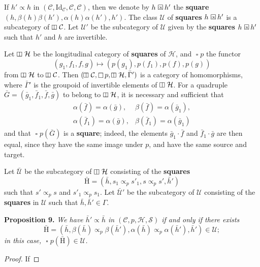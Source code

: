 \documentclass[fleqn]{article}
\newenvironment{itenv}[1]
  {\phantomsection\par\medskip\noindent\textbf{#1.}\itshape}
  {\par\medskip}
\newcommand{\oldpage}[1]{\marginpar{\footnotesize$\Big\vert$ \textit{p.~#1}}}
\newcommand{\unsure}[1]{{\color{purple}\textbf{#1}}}
\newcommand{\CC}{\mathcal{C}}
\newcommand{\HH}{\mathcal{H}}
\newcommand{\rHH}{\mathrm{H}}
\renewcommand{\SS}{\mathcal{S}}
\newcommand{\UU}{\mathcal{U}}
\newcommand{\subs}{\mathrel{\propto}}
\newcommand{\Id}{\mathrm{Id}}
\DeclareMathOperator{\sq}{\square}
\DeclareMathOperator{\vsq}{\raisebox{-.1em}{\rotatebox{90}{$\boxminus$}\,}}
\newcommand{\sqsubs}{\mathrel{\mathrlap{\square}\raisebox{.15em}{\scaleobj{0.7}{\,\propto}}}}
\begin{document}
If $h'\subs h$ in $(\CC,\Id_\CC,\CC,\CC)$, then we denote by $h\sqsubs h'$ the \unsure{square} $(h,\beta(h)\beta(h'),\alpha(h)\alpha(h'),h')$.
The class $\UU$ of \unsure{squares} $h\sqsubs h'$ is a subcategory of $\vsq\CC$.
Let $\UU'$ be the subcategory of $\UU$ given by the \unsure{squares} $h\sqsubs h'$ such that $h'$ and $h$ are invertible.

Let $\vsq\HH$ be the longitudinal category of \unsure{squares} of $\HH$, and $\sq p$ the functor
\[
  (g_1,f_1,f,g)
  \longmapsto (p(g_1),p(f_1),p(f),p(g))
\]
from $\vsq\HH$ to $\vsq\CC$.
Then $(\vsq\CC,\sq p,\vsq\HH,\bar{\Gamma}')$ is a category of homomorphisms, where $\bar{\Gamma}'$ is the groupoid of invertible elements of $\vsq\HH$.
For a quadruple $\bar{G}=(\bar{g}_1,\bar{f}_1,\bar{f},\bar{g})$ to belong to $\vsq\HH$, it is necessary and sufficient that
\[
  \begin{array}{ll}
    \alpha(\bar{f})=\alpha(\bar{g}),
    & \beta(\bar{f})=\alpha(\bar{g}_1),
  \\\alpha(\bar{f}_1)=\alpha(\bar{g}),
    & \beta(\bar{f}_1)=\alpha(\bar{g}_1)
  \end{array}
\]
and that $\sq p(\bar{G})$ is a \unsure{square};
indeed, the elements $\bar{g}_1\cdot\bar{f}$ and $\bar{f}_1\cdot\bar{g}$ are then equal, since they have the same image under $p$, and have the same source and target.

\oldpage{366}
Let $\bar{\UU}$ be the subcategory of $\vsq\HH$ consisting of the \unsure{squares}
\[
  \bar{\rHH}
  = (\bar{h}, s_1\subs_p s'_1, s\subs_p s', \bar{h}')
\]
such that $s'\subs_p s$ and $s'_1\subs_p s_1$.
Let $\bar{\UU}'$ be the subcategory of $\UU$ consisting of the \unsure{squares} in $\UU$ such that $\bar{h},\bar{h}'\in\Gamma$.

\begin{itenv}{Proposition 9}
  We have $\bar{h}'\subs\bar{h}$ in $(\CC,p,\HH,\SS)$ if and only if there exists
  \[
    \bar{\rHH}
    = \left(
      \bar{h},
      \beta(\bar{h})\subs_p\beta(\bar{h}'),
      \alpha(\bar{h})\subs_p\alpha(\bar{h}'),
      \bar{h}'
    \right) \in \UU;
  \]
  in this case, $\sq p(\bar{\rHH})\in\UU$.
\end{itenv}

\begin{proof}
  If
\end{proof}





\nocite{*}
\printbibliography[heading=bibintoc,title=Bibliography]
\end{document}
